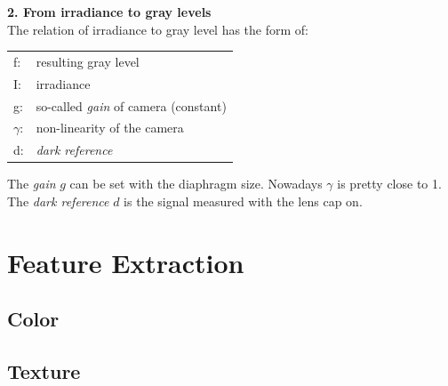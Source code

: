 \documentclass[a4paper, fontsize=8pt, landscape, DIV=1]{scrartcl}
\begin{document}
\begin{multicols*}{4}
		\textbf{2. From irradiance to gray levels}\\
		The relation of irradiance to gray level has the form of: 
		\begin{tabular}{l l}
			f:&  resulting gray level\\ 
			I:&  irradiance\\ 
			g:&  so-called \textit{gain} of camera (constant)\\ 
			$\gamma$:&  non-linearity of the camera \\ 
			d:&  \textit{dark reference}\\  
		\end{tabular}
		\par 
		The \textit{gain} $g$ can be set with the diaphragm size. Nowadays $\gamma$ is pretty close to 1. The \textit{dark reference} $d$ is the signal measured with the lens cap on. 
		\par 
		\vfill\null
		\columnbreak
		
		\section{Feature Extraction}	
		\subsection{Color}
		\subsection{Texture}
		
		
		
	\end{multicols*}
	\setcounter{secnumdepth}{3}
\end{document}

